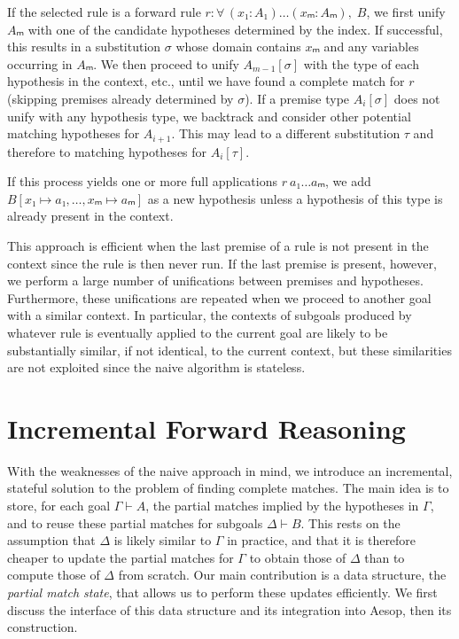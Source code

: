 \documentclass[runningheads]{llncs}
\newcommand{\jcom}[1]{{\color{orange}{Jannis: #1}} }
\newcommand{\All}[2]{\ensuremath{\forall\, #1,\; #2}}
\begin{document}
If the selected rule is a forward rule $r : \All{(x₁ : A₁) \dots (xₘ : Aₘ)}{B}$, we first unify $Aₘ$ with one of the candidate hypotheses determined by the index.
If successful, this results in a substitution $σ$ whose domain contains $xₘ$ and any variables occurring in $Aₘ$.
We then proceed to unify $A_{m-1}[σ]$ with the type of each hypothesis in the context, etc., until we have found a complete match for $r$ (skipping premises already determined by $σ$).
If a premise type $A_{i}[σ]$ does not unify with any hypothesis type, we backtrack and consider other potential matching hypotheses for $A_{i+1}$.
This may lead to a different substitution $τ$ and therefore to matching hypotheses for $A_{i}[τ]$.

If this process yields one or more full applications $r~a₁ \dots aₘ$, we add $B[x₁ ↦ a₁, \dots, xₘ ↦ aₘ]$ as a new hypothesis unless a hypothesis of this type is already present in the context.

\jcom{Add example?}

This approach is efficient when the last premise of a rule is not present in the context since the rule is then never run.
If the last premise is present, however, we perform a large number of unifications between premises and hypotheses.
Furthermore, these unifications are repeated when we proceed to another goal with a similar context.
In particular, the contexts of subgoals produced by whatever rule is eventually applied to the current goal are likely to be substantially similar, if not identical, to the current context, but these similarities are not exploited since the naive algorithm is stateless.

\jcom{Mention fast subsumption paper?}

\section{Incremental Forward Reasoning}

With the weaknesses of the naive approach in mind, we introduce an incremental, stateful solution to the problem of finding complete matches.
The main idea is to store, for each goal $Γ ⊢ A$, the partial matches implied by the hypotheses in $Γ$, and to reuse these partial matches for subgoals $Δ ⊢ B$.
This rests on the assumption that $Δ$ is likely similar to $Γ$ in practice, and that it is therefore cheaper to update the partial matches for $Γ$ to obtain those of $Δ$ than to compute those of $Δ$ from scratch.
Our main contribution is a data structure, the \emph{partial match state}, that allows us to perform these updates efficiently.
We first discuss the interface of this data structure and its integration into Aesop, then its construction.
\end{document}
